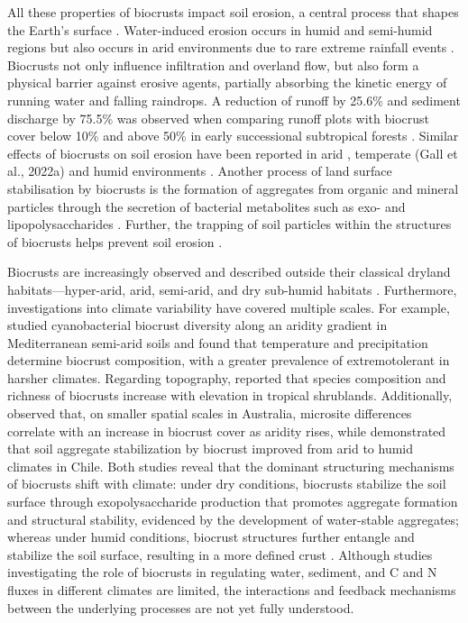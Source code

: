 All these properties of biocrusts impact soil erosion, a central process that shapes the Earth's surface \cite{Luetzenburg2020,Scholten2019}. Water-induced erosion occurs in humid and semi-humid regions \citep{Gholzom2012,Khaleghi2018} but also occurs in arid environments due to rare extreme rainfall events \citep{Hu2022}. Biocrusts not only influence infiltration and overland flow, but also form a physical barrier against erosive agents, partially absorbing the kinetic energy of running water and falling raindrops. A reduction of runoff by 25.6\% and sediment discharge by 75.5\% was observed when comparing runoff plots with biocrust cover below 10\% and above 50\% in early successional subtropical forests \citep{Seitz2017}. Similar effects of biocrusts on soil erosion have been reported in arid \citep{Bowker2018,Eldridge2021}, temperate (Gall et al., 2022a) and humid environments \citep{Guo2022,Zhao2014}. Another process of land surface stabilisation by biocrusts is the formation of aggregates from organic and mineral particles through the secretion of bacterial metabolites such as exo- and lipopolysaccharides \citep{Costa2018,Tourney2014,Xiao2022}. Further, the trapping of soil particles within the structures of biocrusts helps prevent soil erosion \citep{RiverasMunoz2022,Rodriguez2024,Xiao2022}.

Biocrusts are increasingly observed and described outside their classical dryland habitats—hyper-arid, arid, semi-arid, and dry sub-humid habitats \citep{Gall2022a,Weber2022}. Furthermore, investigations into climate variability have covered multiple scales. For example, \citet{MunozMartin2019} studied cyanobacterial biocrust diversity along an aridity gradient in Mediterranean semi-arid soils and found that temperature and precipitation determine biocrust composition, with a greater prevalence of extremotolerant in harsher climates. Regarding topography, \citet{CastilloMonroy2016} reported that species composition and richness of biocrusts increase with elevation in tropical shrublands. Additionally, \citet{Ding2020} observed that, on smaller spatial scales in Australia, microsite differences correlate with an increase in biocrust cover as aridity rises, while \citet{RiverasMunoz2022} demonstrated that soil aggregate stabilization by biocrust improved from arid to humid climates in Chile. Both studies reveal that the dominant structuring mechanisms of biocrusts shift with climate: under dry conditions, biocrusts stabilize the soil surface through exopolysaccharide production that promotes aggregate formation and structural stability, evidenced by the development of water-stable aggregates; whereas under humid conditions, biocrust structures further entangle and stabilize the soil surface, resulting in a more defined crust \citep{RiverasMunoz2022}. Although studies investigating the role of biocrusts in regulating water, sediment, and C and N fluxes in different climates are limited, the interactions and feedback mechanisms between the underlying processes are not yet fully understood.

